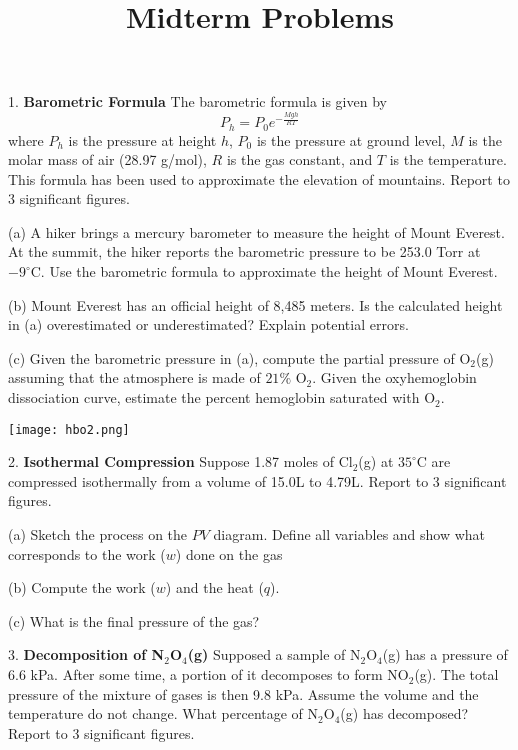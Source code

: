 \documentclass[11pt]{article}
\title{\textbf{Midterm Problems}}
\begin{document}
\maketitle

1. \textbf{Barometric Formula} The barometric formula is given by
\begin{equation*}
  P_h = P_0 e^{-\frac{Mgh}{RT}}
\end{equation*}
where $P_h$ is the pressure at height $h$, $P_0$ is the pressure at ground level,
$M$ is the molar mass of air (28.97 g/mol), $R$ is the gas constant, and $T$ is the
temperature. This formula has been used to approximate the elevation of mountains.
Report to 3 significant figures.

(a) A hiker brings a mercury barometer to measure the height of Mount Everest. At the
summit, the hiker reports the barometric pressure to be 253.0 Torr at $-9^\circ\text{C}$.
Use the barometric formula to approximate the height of Mount Everest.


(b) Mount Everest has an official height of 8,485 meters. Is the calculated height in
(a) overestimated or underestimated? Explain potential errors.

(c) Given the barometric pressure in (a), compute the partial pressure of O$_2$(g) assuming
that the atmosphere is made of $21\%$ O$_2$. Given the oxyhemoglobin dissociation curve,
estimate the percent hemoglobin saturated with O$_2$.

\begin{center}
  \texttt{[image: hbo2.png]}
\end{center}

%
%
%
%
%

2. \textbf{Isothermal Compression} Suppose 1.87 moles of Cl$_2$(g) at $35^\circ\text{C}$ are
compressed isothermally from a volume of 15.0L to 4.79L. Report to 3 significant figures.

(a) Sketch the process on the $PV$ diagram. Define all variables and show what corresponds
to the work ($w$) done on the gas

(b) Compute the work ($w$) and the heat ($q$).

(c) What is the final pressure of the gas?

3. \textbf{Decomposition of N$_2$O$_4$(g)} Supposed a sample of N$_2$O$_4$(g) has
a pressure of 6.6 kPa. After some time, a portion of it decomposes to form NO$_2$(g).
The total pressure of the mixture of gases is then 9.8 kPa. Assume the volume and the
temperature do not change. What percentage of N$_2$O$_4$(g) has decomposed? Report to
3 significant figures.

\pagebreak
\end{document}
